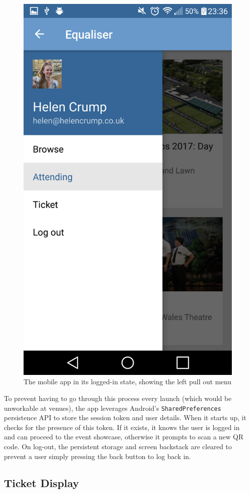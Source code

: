 \documentclass[12pt,a4paper]{bhamdissertation}
\newcommand{\code}[1]{\texttt{#1}}
\begin{document}
\begin{figure}[!htbp]
    \centering
    \includegraphics[width=.5\linewidth]{img/app_left_menu.png}
    \caption{The mobile app in its logged-in state, showing the left pull out menu}
    \label{fig:app_left_menu}
\end{figure}

To prevent having to go through this process every launch (which would be unworkable at venues), the app leverages Android's \code{SharedPreferences} persistence API to store the session token and user details. When it starts up, it checks for the presence of this token. If it exists, it knows the user is logged in and can proceed to the event showcase, otherwise it prompts to scan a new QR code. On log-out, the persistent storage and screen backstack are cleared to prevent a user simply pressing the back button to log back in.

\subsection{Ticket Display}
\end{document}
